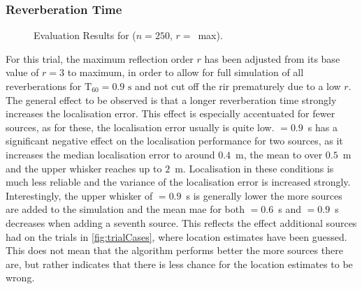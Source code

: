 \subsubsection*{Reverberation Time}
\begin{figure}[H]
\iftoggle{quick}{%
    \texttt{[image: plots/boxplots/boxplot-joined-T60]}
}{%
    
}%
	\caption[Evaluation Results for \Tsixty]{Evaluation Results for \Tsixty ($n=250$, $r=$~max).}
	\label{fig:trialT60}
\end{figure}

For this trial, the maximum reflection order $r$ has been adjusted from its base value of $r=3$ to maximum, in order to allow for full simulation of all reverberations for ${\text{T}_{60}=0.9\text{~s}}$ and not cut off the \gls{rir} prematurely due to a low $r$. The general effect to be observed is that a longer reverberation time strongly increases the localisation error. This effect is especially accentuated for fewer sources, as for these, the localisation error usually is quite low. \Tsixty$=0.9$~s has a significant negative effect on the localisation performance for two sources, as it increases the median localisation error to around $0.4$~m, the mean to over $0.5$~m and the upper whisker reaches up to $2$~m. Localisation in these conditions is much less reliable and the variance of the localisation error is increased strongly. Interestingly, the upper whisker of \Tsixty$=0.9$~s is generally lower the more sources are added to the simulation and the mean \gls{mae} for both \Tsixty$=0.6$~s and \Tsixty$=0.9$~s decreases when adding a seventh source. This reflects the effect additional sources had on the trials in \autoref{fig:trialCases}, where location estimates have been guessed. This does not mean that the algorithm performs better the more sources there are, but rather indicates that there is less chance for the location estimates to be wrong.